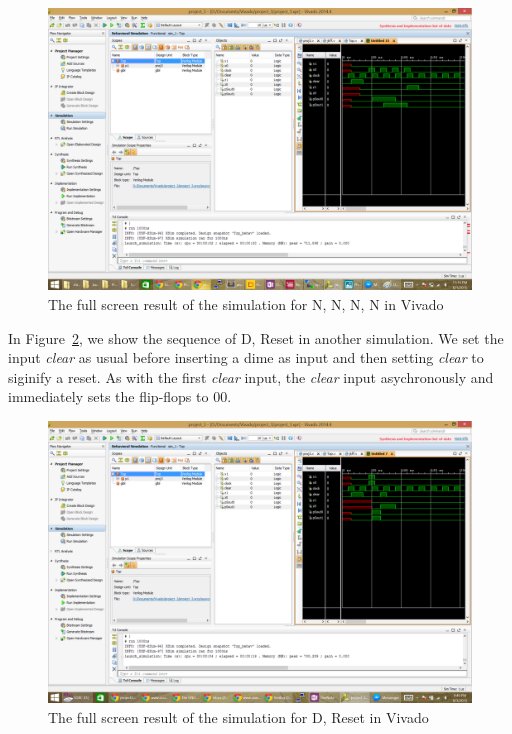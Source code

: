 \documentclass{article}
\begin{document}
\clearpage

\begin{figure}[h!]
\centering
\includegraphics[scale=0.4]{NNNN}
\caption{The full screen result of the simulation for N, N, N, N in Vivado}
\label{fig:nnnn}
\end{figure}

In Figure~\ref{fig:d_reset}, we show the sequence of D, Reset in another 
simulation. We set the input \textit{clear} as usual before inserting a dime as 
input and then setting \textit{clear} to siginify a reset. As with the first 
\textit{clear} input, the \textit{clear} input asychronously and immediately 
sets the flip-flops to 00.

\clearpage

\begin{figure}[h!]
\centering
\includegraphics[scale=0.4]{D_Reset}
\caption{The full screen result of the simulation for D, Reset in Vivado}
\label{fig:d_reset}
\end{figure}
\end{document}
